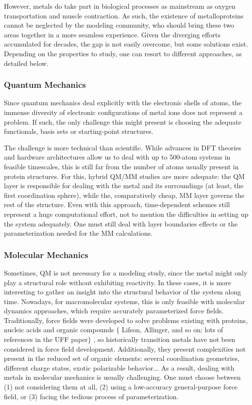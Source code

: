 However, metals do take part in biological processes as mainstream as oxygen transportation and muscle contraction. As such, the existence of metalloproteins cannot be neglected by the modeling community, who should bring these two areas together in a more seamless experience. Given the diverging efforts accumulated for decades, the gap is not easily overcome, but some solutions exist. Depending on the properties to study, one can resort to different approaches, as detailed below.

\subsubsection{Quantum Mechanics}
Since quantum mechanics deal explicitly with the electronic shells of atoms, the immense diversity of electronic configurations of metal ions does not represent a problem. If such, the only challenge this might present is choosing the adequate functionals, basis sets or starting-point structures.

The challenge is more technical than scientific. While advances in DFT theories and hardware architectures allow us to deal with up to 500-atom systems in feasible timescales, this is still far from the number of atoms usually present in protein structures. For this, hybrid QM/MM studies are more adequate: the QM layer is responsible for dealing with the metal and its surroundings (at least, the first coordination sphere), while the, comparatively cheap, MM layer governs the rest of the structure. Even with this approach, time-dependent schemes still represent a huge computational effort, not to mention the difficulties in setting up the system adequately. One must still deal with layer boundaries effects or the parameterization needed for the MM calculations.

\subsubsection{Molecular Mechanics}
Sometimes, QM is not necessary for a modeling study, since the metal might only play a structural role without exhibiting reactivity. In these cases, it is more interesting to gather an insight into the structural behavior of the system along time. Nowadays, for macromolecular systems, this is only feasible with molecular dynamics approaches, which require accurately parameterized force fields. Traditionally, force fields were developed to solve problems existing with proteins, nucleic acids and organic compounds $ \{ $ Lifson, Allinger, and so on; lots of references in the UFF paper$ \} $ , so historically transition metals have not been considered in force field development. Additionally, they present complexities not present in the reduced set of organic elements: several coordination geometries, different charge states, exotic polarizable behavior... As a result, dealing with metals in molecular mechanics is usually challenging. One must choose between (1) not considering them at all, (2) using a low-accuracy general-purpose force field, or (3) facing the tedious process of parameterization.

